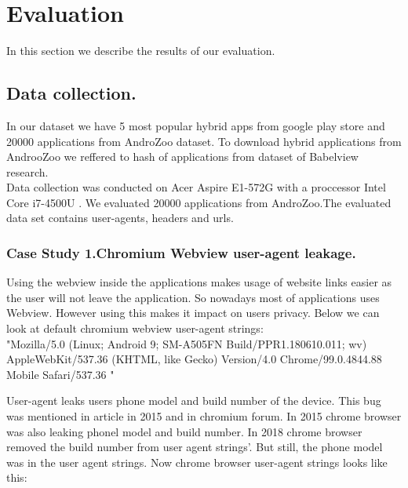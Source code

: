 \section{Evaluation}
In this section we describe the results of our evaluation.

\subsection{Data collection.}
In our dataset we have 5 most popular hybrid apps from google play store and 20000 applications from AndroZoo dataset\cite{allix2016androzoo}. To download hybrid applications from AndrooZoo we reffered to hash of applications from dataset of Babelview  research\cite{rizzo2018babelview}.\\
Data collection was conducted on Acer Aspire E1-572G with a proccessor Intel Core i7-4500U . We evaluated 20000 applications from AndroZoo.The evaluated data set contains user-agents, headers and urls.

\par
\subsubsection{Case Study 1.Chromium Webview user-agent leakage.}\par

 Using the webview inside the applications makes usage of website links easier as the user will not leave the application. So nowadays most of applications uses  Webview. However using this makes it impact on users privacy. Below we can look at default chromium webview user-agent strings:\\
 
         "Mozilla/5.0 (Linux; Android 9; SM-A505FN Build/PPR1.180610.011; wv)                     AppleWebKit/537.36 (KHTML, like Gecko) Version/4.0  Chrome/99.0.4844.88              Mobile Safari/537.36 "         \\
         \par

User-agent leaks users phone model and build number of the device. This bug was mentioned in article in 2015\cite{nightwatch} and in chromium forum\cite{forum}. In 2015 chrome browser was also leaking phonel model and build number. In 2018 chrome browser removed the build number from user agent strings'\cite{nightwatch1}. But still, the phone model was in the user agent strings. Now chrome browser user-agent strings looks like this:\\

